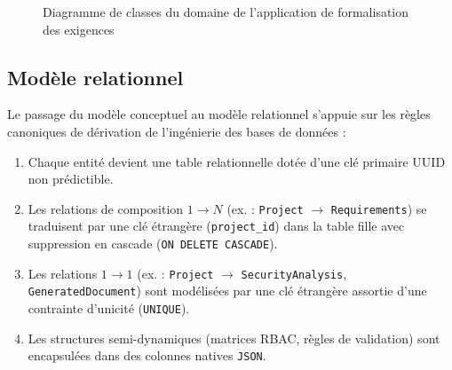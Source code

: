 \begin{figure}[H]
\caption{Diagramme de classes du domaine de l'application de formalisation des exigences}
\label{fig:class_diagram}
\end{figure}

\subsection{Modèle relationnel}

Le passage du modèle conceptuel au modèle relationnel s'appuie sur les règles canoniques de dérivation de l'ingénierie des bases de données :
\begin{enumerate}
    \item Chaque entité devient une table relationnelle dotée d'une clé primaire UUID non prédictible.
    \item Les relations de composition $1 \rightarrow N$ (ex. : \texttt{Project} $\rightarrow$ \texttt{Requirements}) se traduisent par une clé étrangère (\texttt{project\_id}) dans la table fille avec suppression en cascade (\texttt{ON DELETE CASCADE}).
    \item Les relations $1 \rightarrow 1$ (ex. : \texttt{Project} $\rightarrow$ \texttt{SecurityAnalysis}, \texttt{GeneratedDocument}) sont modélisées par une clé étrangère assortie d'une contrainte d'unicité (\texttt{UNIQUE}).
    \item Les structures semi-dynamiques (matrices RBAC, règles de validation) sont encapsulées dans des colonnes natives \texttt{JSON}.
\end{enumerate}

